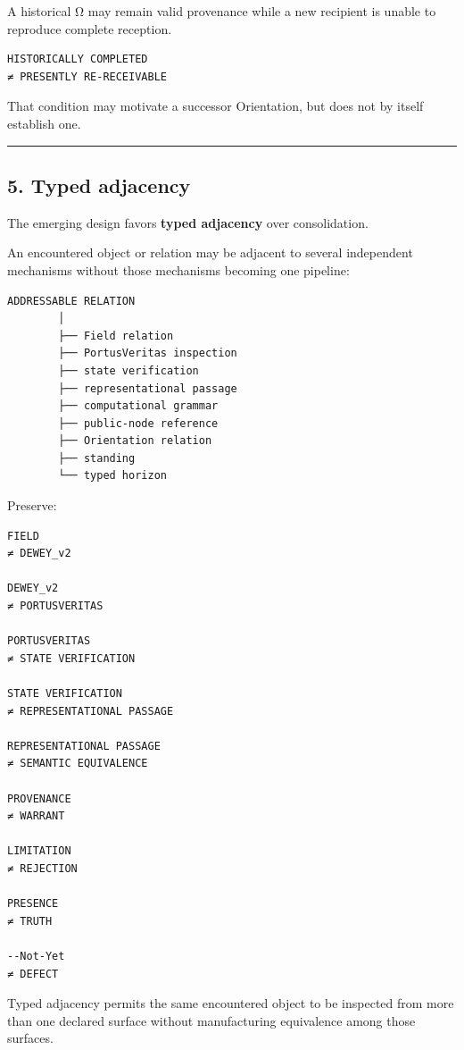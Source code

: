 A historical Ω may remain valid provenance while a new recipient is
unable to reproduce complete reception.

\begin{verbatim}
HISTORICALLY COMPLETED
≠ PRESENTLY RE-RECEIVABLE
\end{verbatim}

That condition may motivate a successor Orientation, but does not by
itself establish one.

\begin{center}\rule{0.5\linewidth}{0.5pt}\end{center}

\subsection{5. Typed adjacency}\label{typed-adjacency}

The emerging design favors \textbf{typed adjacency} over consolidation.

An encountered object or relation may be adjacent to several independent
mechanisms without those mechanisms becoming one pipeline:

\begin{verbatim}
ADDRESSABLE RELATION
        │
        ├── Field relation
        ├── PortusVeritas inspection
        ├── state verification
        ├── representational passage
        ├── computational grammar
        ├── public-node reference
        ├── Orientation relation
        ├── standing
        └── typed horizon
\end{verbatim}

Preserve:

\begin{verbatim}
FIELD
≠ DEWEY_v2

DEWEY_v2
≠ PORTUSVERITAS

PORTUSVERITAS
≠ STATE VERIFICATION

STATE VERIFICATION
≠ REPRESENTATIONAL PASSAGE

REPRESENTATIONAL PASSAGE
≠ SEMANTIC EQUIVALENCE

PROVENANCE
≠ WARRANT

LIMITATION
≠ REJECTION

PRESENCE
≠ TRUTH

--Not-Yet
≠ DEFECT
\end{verbatim}

Typed adjacency permits the same encountered object to be inspected from
more than one declared surface without manufacturing equivalence among
those surfaces.

